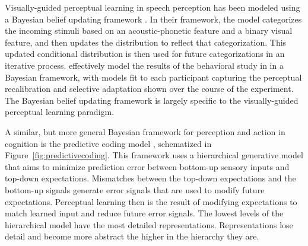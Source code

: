 
Visually-guided perceptual learning in speech perception has been modeled using a Bayesian belief updating framework \citep{Kleinschmidt2011}.  
In their framework, the model categorizes the incoming stimuli based on an acoustic-phonetic feature and a binary visual feature, and then updates the distribution to reflect that categorization.
This updated conditional distribution is then used for future categorizations in an iterative process.  
\citet{Kleinschmidt2011} effectively model the results of the behavioral study in \citet{Vroomen2007} in a Bayesian framework, with models fit to each participant capturing the perceptual recalibration and selective adaptation shown over the course of the experiment.
The Bayesian belief updating framework is largely specific to the visually-guided perceptual learning paradigm.

A similar, but more general Bayesian framework for perception and action in cognition is the predictive coding model \citep{Clark2013}, schematized in Figure~\ref{fig:predictivecoding}.
This framework uses a hierarchical generative model that aims to minimize prediction error between bottom-up sensory inputs and top-down expectations.  
Mismatches between the top-down expectations and the bottom-up signals generate error signals that are used to modify future expectations.  
Perceptual learning then is the result of modifying expectations to match learned input and reduce future error signals.
The lowest levels of the hierarchical model have the most detailed representations.
Representations lose detail and become more abstract the higher in the hierarchy they are.


